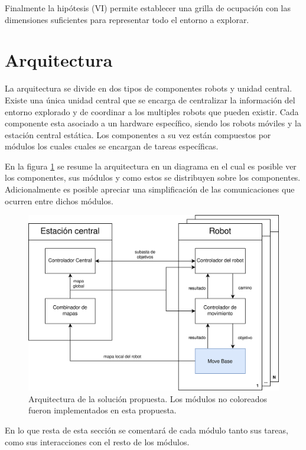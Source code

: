 Finalmente la hipótesis (VI) permite establecer una grilla de ocupación con las
dimensiones suficientes para representar todo el entorno a explorar. 

\section{Arquitectura}\label{sec:arqui}
La arquitectura se divide en dos tipos de componentes robots y unidad central.
Existe una única unidad central que se encarga de centralizar la información
del entorno explorado y de coordinar a los multiples robots que pueden existir.
Cada componente esta asociado a un hardware específico, siendo los robots móviles
y la estación central estática. 
Los componentes a su vez están compuestos por módulos los cuales cuales se encargan
de tareas específicas. 

En la figura \ref{fig:arquitectura} se resume la arquitectura en un diagrama en
el cual es posible ver los componentes, sus módulos y como estos se distribuyen
sobre los componentes. Adicionalmente es posible apreciar una simplificación de las
comunicaciones que ocurren entre dichos módulos.


\begin{figure}[H]
  \center
  \includegraphics[width=1\linewidth]{imagenes/arquitectura.png}
  \caption[Arquitectura de la solucion propuesta.]{Arquitectura de la solución propuesta. Los módulos no coloreados fueron implementados en esta propuesta.}
  \label{fig:arquitectura}
\end{figure} 

En lo que resta de esta sección se comentará de cada módulo tanto sus tareas,
como sus interacciones con el resto de los módulos.

